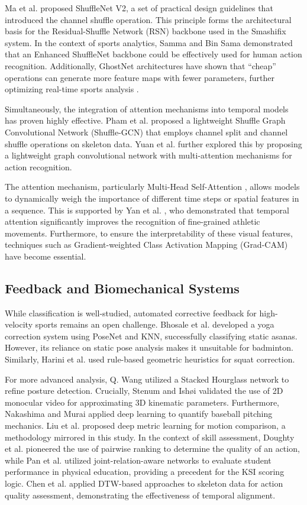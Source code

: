 \documentclass[pdflatex,sn-mathphys-num]{sn-jnl}%
\theoremstyle{thmstyleone}%
\theoremstyle{thmstyletwo}%
\theoremstyle{thmstylethree}%
\begin{document}
Ma et al. \cite{b24} proposed ShuffleNet V2, a set of practical design guidelines that introduced the channel shuffle operation. This principle forms the architectural basis for the Residual-Shuffle Network (RSN) backbone used in the Smashifix system. In the context of sports analytics, Samma and Bin Sama \cite{b25} demonstrated that an Enhanced ShuffleNet backbone could be effectively used for human action recognition. Additionally, GhostNet architectures have shown that ``cheap'' operations can generate more feature maps with fewer parameters, further optimizing real-time sports analysis \cite{b26}.

Simultaneously, the integration of attention mechanisms into temporal models has proven highly effective. Pham et al. \cite{b27} proposed a lightweight Shuffle Graph Convolutional Network (Shuffle-GCN) that employs channel split and channel shuffle operations on skeleton data. Yuan et al. \cite{b28} further explored this by proposing a lightweight graph convolutional network with multi-attention mechanisms for action recognition.

The attention mechanism, particularly Multi-Head Self-Attention \cite{b29}, allows models to dynamically weigh the importance of different time steps or spatial features in a sequence. This is supported by Yan et al. \cite{b30}, who demonstrated that temporal attention significantly improves the recognition of fine-grained athletic movements. Furthermore, to ensure the interpretability of these visual features, techniques such as Gradient-weighted Class Activation Mapping (Grad-CAM) \cite{b31} have become essential.

\subsection{Feedback and Biomechanical Systems}
While classification is well-studied, automated corrective feedback for high-velocity sports remains an open challenge. Bhosale et al. \cite{b32} developed a yoga correction system using PoseNet and KNN, successfully classifying static asanas. However, its reliance on static pose analysis makes it unsuitable for badminton. Similarly, Harini et al. \cite{b33} used rule-based geometric heuristics for squat correction. 

For more advanced analysis, Q. Wang \cite{b34} utilized a Stacked Hourglass network to refine posture detection. Crucially, Stenum and Ish\o i \cite{b35} validated the use of 2D monocular video for approximating 3D kinematic parameters. Furthermore, Nakashima and Murai \cite{b36} applied deep learning to quantify baseball pitching mechanics. Liu et al. \cite{b37} proposed deep metric learning for motion comparison, a methodology mirrored in this study. In the context of skill assessment, Doughty et al. \cite{b38} pioneered the use of pairwise ranking to determine the quality of an action, while Pan et al. \cite{b39} utilized joint-relation-aware networks to evaluate student performance in physical education, providing a precedent for the KSI scoring logic. Chen et al. \cite{b40} applied DTW-based approaches to skeleton data for action quality assessment, demonstrating the effectiveness of temporal alignment.
\end{document}
